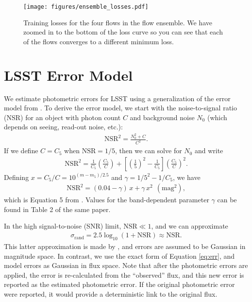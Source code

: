 \documentclass[twocolumn,twocolappendix]{aastex631}
\begin{document}
\begin{figure}[t!]
    \begin{centering}
        \texttt{[image: figures/ensemble\_losses.pdf]}
        \caption{
            Training losses for the four flows in the flow ensemble.
            We have zoomed in to the bottom of the loss curve so you can see that each of the flows converges to a different minimum loss.
        }
        \label{fig:ensemble-losses}
    \end{centering}
\end{figure}


\section{LSST Error Model}
\label{app:error-model}

We estimate photometric errors for LSST using a generalization of the error model from \citet{ivezic2019}.
To derive the error model, we start with the noise-to-signal ratio (NSR) for an object with photon count $C$ and background noise $N_0$ (which depends on seeing, read-out noise, etc.):
\begin{align}
    \text{NSR}^2 = \frac{N_0^2 + C}{C^2}.
\end{align}
If we define $C=C_5$ when $\text{NSR}= 1/5$, then we can solve for $N_0$ and write
\begin{align}
    \text{NSR}^2 = \frac{1}{C_5} \left( \frac{C_5}{C} \right) + \left[ \left( \frac{1}{5} \right)^2 - \frac{1}{C_5} \right] \left( \frac{C_5}{C} \right)^2.
\end{align}
Defining $x = C_5/C = 10^{(m-m_5)/2.5}$ and $\gamma = 1/5^2 - 1/C_5$, we have
\begin{align}
    \text{NSR}^2 = (0.04 - \gamma) \, x + \gamma \, x^2 ~~ (\text{mag}^2),
\end{align}
which is Equation 5 from \citet{ivezic2019}.
Values for the band-dependent parameter $\gamma$ can be found in Table 2 of the same paper.

In the high signal-to-noise (SNR) limit, $\text{NSR} \ll 1$, and we can approximate
\begin{align}
    \sigma_\text{rand} = 2.5 \log_{10}(1 + \text{NSR}) \approx \text{NSR}.
    \label{eq:err}
\end{align}
This latter approximation is made by \citet{ivezic2019}, and errors are assumed to be Gaussian in magnitude space.
In contrast, we use the exact form of Equation \ref{eq:err}, and model errors as Gaussian in flux space.
Note that after the photometric errors are applied, the error is re-calculated from the ``observed'' flux, and this new error is reported as the estimated photometric error.
If the original photometric error were reported, it would provide a deterministic link to the original flux.
\end{document}
